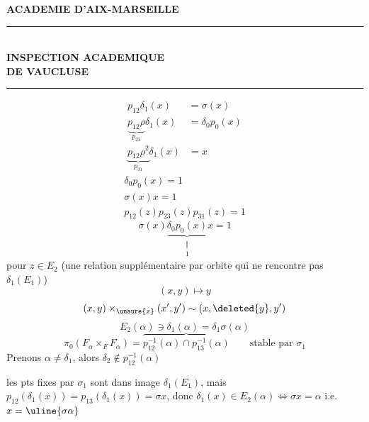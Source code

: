 \textbf{ACADEMIE D'AIX-MARSEILLE}\\
\rule{3cm}{.4pt}\\
\textbf{INSPECTION ACADEMIQUE}\\
\textbf{DE VAUCLUSE}\\
\rule{1cm}{.4pt}
\[\begin{aligned}
p_{12}\delta_1(x)&=\sigma(x)\\
\underbrace{p_{12}\rho}_{p_{23}}\delta_1(x)&=\delta_0p_0(x)\\
\underbrace{p_{12}\rho^2}_{p_{31}}\delta_1(x)&=x
\end{aligned}\]
\[\boxed{\begin{gathered}
\delta_0p_0(x)=1\\
\sigma(x)x=1\\[.5em]
p_{12}(z)p_{23}(z)p_{31}(z)=1
\end{gathered}}\]
\[\sigma(x)\underbrace{\delta_0p_0(x)}_{\substack{\Vert\\1}}x=1\]
pour $z\in E_2$ (une relation  supplémentaire par orbite  qui ne rencontre pas $\delta_1(E_1)$)
\[(x,y)\mapsto y\]
\[(x,y)\times_{\unsure{x}}(x',y')\sim(x,\deleted{y},y')\]
\[E_2(\alpha)\ni\delta_1(\alpha)=\delta_1\sigma(\alpha)\]
\[\pi_0(F_\alpha\times_F F_\alpha)=\overbrace{p_{12}^{-1}(\alpha)\cap p_{13}^{-1}(\alpha)}\qquad\text{stable par }\sigma_1\]
Prenons $\alpha\ne\delta_1$, alors $\delta_2\notin p_{12}^{-1}(\alpha)$

les pts fixes par $\sigma_1$ sont dans image $\delta_1(E_1)$, mais $p_{12}(\delta_1(x))=p_{13}(\delta_1(x))=\sigma x$, donc 
 $\delta_1(x)\in E_2(\alpha)\Longleftrightarrow\sigma x=\alpha$ i.e. $x=\uline{\sigma\alpha}$

